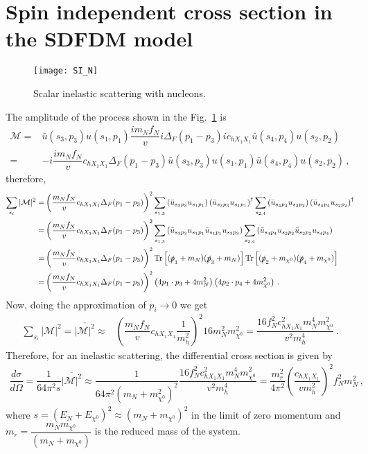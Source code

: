 \section{Spin independent cross section in the SDFDM model}
\label{sec:SI-amplitude}

\begin{figure}[h]
  \centering
  \texttt{[image: SI\_N]}
  \caption{Scalar inelastic scattering with nucleons.}
  \label{fig:SI_N}
\end{figure}
%
The amplitude of the process shown in the Fig.~\ref{fig:SI_N} is
\begin{align}
\mathcal{M}=&\bar{u}(s_3,p_3)u(s_1,p_1)\dfrac{im_Nf_N}{v}i\Delta_F(p_1-p_3)ic_{hX_1X_1}\bar{u}(s_4,p_4)u(s_2,p_2)\nonumber\\
=& -i\dfrac{im_Nf_N}{v}c_{hX_1X_1}\Delta_F(p_1-p_3) \bar{u}(s_3,p_3)u(s_1,p_1)\bar{u}(s_4,p_4)u(s_2,p_2)\,,
\end{align}
therefore,
\begin{align}
\sum_{s_i}|\mathcal{M}|^2=&\left(\dfrac{m_Nf_N}{v}c_{hX_1X_1}\Delta_F(p_1-p_3)\right)^2
\sum_{s_{1,3}}\left(\bar{u}_{s_3p_3}u_{s_1p_1}\right)\left(\bar{u}_{s_3p_3}u_{s_1p_1}\right)^{\dagger}
\sum_{s_{2,4}}\left(\bar{u}_{s_4p_4}u_{s_2p_2}\right)\left(\bar{u}_{s_4p_4}u_{s_2p_2}\right)^{\dagger}\nonumber\\
=&\left(\dfrac{m_Nf_N}{v}c_{hX_1X_1}\Delta_F(p_1-p_3)\right)^2
\sum_{s_{1,3}}\left(\bar{u}_{s_3p_3}u_{s_1p_1}\bar{u}_{s_1p_1}u_{s_3p_3}\right)
\sum_{s_{2,4}}\left(\bar{u}_{s_4p_4}u_{s_2p_2}\bar{u}_{s_2p_2}u_{s_4p_4}\right)\nonumber\\
=&\left(\dfrac{m_Nf_N}{v}c_{hX_1X_1}\Delta_F(p_1-p_3)\right)^2
\text{Tr}\left[(\slashed{p}_1+m_N)(\slashed{p}_3+m_N)\right]
\text{Tr}\left[(\slashed{p}_2+m_{\chi^0})(\slashed{p}_4+m_{\chi^0})\right]\nonumber\\
=&\left(\dfrac{m_Nf_N}{v}c_{hX_1X_1}\Delta_F(p_1-p_3)\right)^2
\left(4p_1\cdot p_3+4m_N^2\right)\left(4p_2\cdot
p_4+4m_{\chi^0}^2\right)\,.
\end{align}
Now, doing the approximation of $p_i\to0$ we get
\begin{align}
\sum_{s_i}|\mathcal{M}|^2=\overline{|\mathcal{M}|^2}\approx&\left(\dfrac{m_Nf_N}{v}c_{hX_1X_1}\dfrac{1}{m_h^2}\right)^2 16m_N^2m_{\chi^0}^2
=\dfrac{16f_N^2c_{hX_1X_1}^2m_N^4m_{\chi^0}^2}{v^2m_h^4}\,.
\end{align}
Therefore, for an inelastic scattering, the differential cross section is given by
\begin{align}
\dfrac{d\sigma}{d\Omega}=\dfrac{1}{64\pi^2 s}\overline{|\mathcal{M}|^2}
\approx\dfrac{1}{64\pi^2 (m_N+m_{\chi^0}^2)^2}\dfrac{16f_N^2c_{hX_1X_1}^2m_N^4m_{\chi^0}^2}{v^2m_h^4}
=\dfrac{m_r^2}{4\pi^2}\left(\dfrac{c_{hX_1X_1}}{vm_h^2}\right)^2f_N^2m_N^2\,,
\end{align}
where $s=(E_N+E_{\chi^0})^2\approx(m_N+m_{\chi^0})^2$ in the limit of zero momentum and $m_r=\dfrac{m_Nm_{\chi^0}}{(m_N+m_{\chi^0})}$ is the reduced mass of the system.

